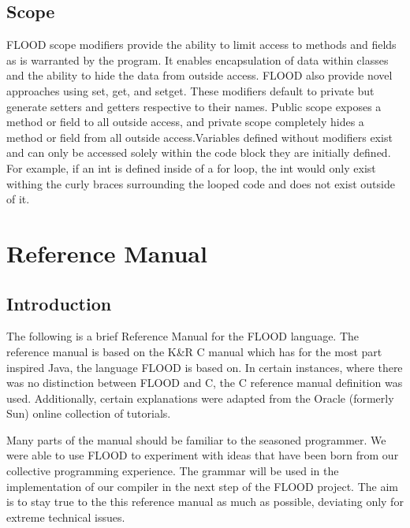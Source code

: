 \documentclass[12pt]{report}
\begin{document}
\section{Scope}

\begin{doublespace}
FLOOD scope modifiers provide the ability to limit access to methods and fields as is warranted by the program. It enables encapsulation of data within classes and the ability to hide the data from outside access. FLOOD also provide novel approaches using set, get, and setget. These modifiers default to private but generate setters and getters respective to their names.  Public scope exposes a method or field to all outside access, and private scope completely hides a method or field from all outside access.Variables defined without modifiers exist and can only be accessed solely within the code block they are initially defined. For example, if an int is defined inside of a for loop, the int would only exist withing the curly braces surrounding the looped code and does not exist outside of it.
\end{doublespace}

\chapter{Reference Manual}

\section{Introduction}

\begin{doublespace}
The following is a brief Reference Manual for the FLOOD language. The reference manual is based on the K\&R C manual which has for the most part inspired Java, the language FLOOD is based on. In certain instances, where there was no distinction between FLOOD and C, the C reference manual definition was used. Additionally, certain explanations were adapted from the Oracle (formerly Sun) online collection of tutorials. 

Many parts of the manual should be familiar to the seasoned programmer. We were able to use FLOOD to experiment with ideas that have been born from our collective programming experience. The grammar will be used in the implementation of our compiler in the next step of the FLOOD project. The aim is to stay true to the this reference manual as much as possible, deviating only for extreme technical issues. 
\end{doublespace}
\end{document}
